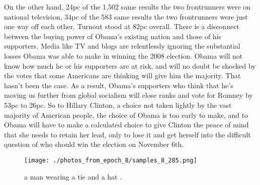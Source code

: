 \documentclass{article}%
\begin{document}
On the other hand, 24pc of the 1,502 same results the two frontrunners were on national television, 34pc of the 583 same results the two frontrunners were just one way off each other. Turnout stood at 82pc overall.\newline%
There is a disconnect between the buying power of Obama’s existing nation and those of his supporters. Media like TV and blogs are relentlessly ignoring the substantial losses Obama was able to make in winning the 2008 election. Obama will not know how much he or his supporters are at risk, and will no doubt be shocked by the votes that some Americans are thinking will give him the majority.\newline%
That hasn’t been the case. As a result, Obama’s supporters who think that he’s moving us further from global socialism will close ranks and vote for Romney by 53pc to 26pc.\newline%
So to Hillary Clinton, a choice not taken lightly by the vast majority of American people, the choice of Obama is too early to make, and to Obama will have to make a calculated choice to give Clinton the peace of mind that she needs to retain her lead, only to lose it and get herself into the difficult question of who should win the election on November 6th.\newline%

%


\begin{figure}[h!]%
\centering%
\texttt{[image: ./photos\_from\_epoch\_8/samples\_8\_285.png]}%
\caption{a man wearing a tie and a hat .}%
\end{figure}

%
\end{document}
